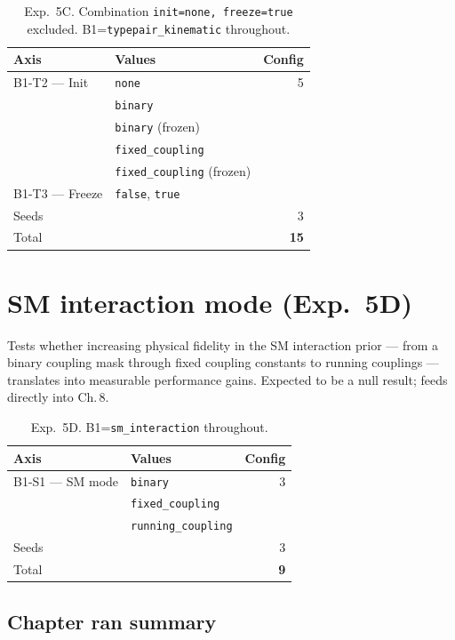 \begin{table}[h]
\centering\small
\begin{tabular}{llr}
\toprule
Axis & Values & Config \\
\midrule
B1-T2 — Init & \texttt{none} & 5 \\
 & \texttt{binary} & \\
 & \texttt{binary} (frozen) & \\
 & \texttt{fixed\_coupling} & \\
 & \texttt{fixed\_coupling} (frozen) & \\
B1-T3 — Freeze & \texttt{false}, \texttt{true} & \\
Seeds & & 3 \\
\midrule
Total & & \textbf{15} \\
\bottomrule
\end{tabular}
\caption{Exp.\ 5C. Combination \texttt{init=none, freeze=true} excluded.
B1=\texttt{typepair\_kinematic} throughout.}
\end{table}

\section{SM interaction mode (Exp.\ 5D)}

Tests whether increasing physical fidelity in the SM interaction
prior --- from a binary coupling mask through fixed coupling constants
to running couplings --- translates into measurable performance gains.
Expected to be a null result; feeds directly into Ch.\,8.\\

\begin{table}[h]
\centering\small
\begin{tabular}{llr}
\toprule
Axis & Values & Config \\
\midrule
B1-S1 — SM mode & \texttt{binary} & 3 \\
 & \texttt{fixed\_coupling} & \\
 & \texttt{running\_coupling} & \\
Seeds & & 3 \\
\midrule
Total & & \textbf{9} \\
\bottomrule
\end{tabular}
\caption{Exp.\ 5D. B1=\texttt{sm\_interaction} throughout.}
\end{table}


\subsection*{Chapter ran summary}

